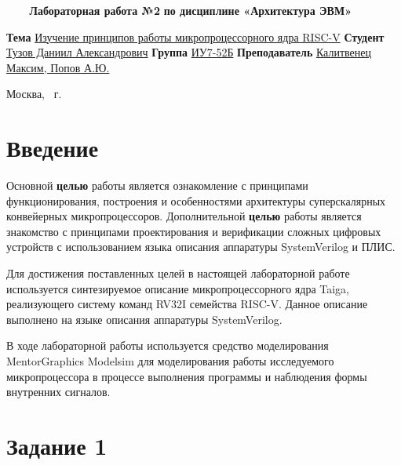 \documentclass{article}
\begin{document}
\begin{titlepage}
	\noindent\begin{minipage}{1.0\textwidth}\centering
		\Large\textbf{   ~~~ Лабораторная работа №2}\newline
		\textbf{по дисциплине «Архитектура ЭВМ»}\newline\newline\newline\newline\newline
	\end{minipage}

	\noindent\textbf{Тема} \underline{Изучение принципов работы микропроцессорного ядра RISC-V}
\newline\newline
	\textbf{Студент} \underline{Тузов Даниил Александрович}\newline\newline
	\textbf{Группа} \underline{ИУ7-52Б}\newline\newline
	\textbf{Преподаватель} \underline{Калитвенец Максим, Попов А.Ю.}
	
	\begin{center}
		\vfill
		Москва, \the\year ~г.
	\end{center}
	\restoregeometry
	\clearpage
\end{titlepage}

\section{Введение}
Основной \textbf{целью} работы является ознакомление с принципами функционирования, построения и особенностями 
архитектуры суперскалярных конвейерных микропроцессоров. Дополнительной \textbf{целью} работы является знакомство с 
принципами проектирования и верификации сложных цифровых устройств с использованием языка описания аппаратуры 
SystemVerilog и ПЛИС.

Для достижения поставленных целей в настоящей лабораторной работе используется синтезируемое описание 
микропроцессорного ядра Taiga, реализующего систему команд RV32I семейства RISC-V. Данное описание выполнено на языке 
описания аппаратуры SystemVerilog.

В ходе лабораторной работы используется средство моделирования MentorGraphics Modelsim для моделирования работы 
исследуемого микропроцессора в процессе выполнения программы и наблюдения формы внутренних сигналов.

\section{Задание 1}
\end{document}
